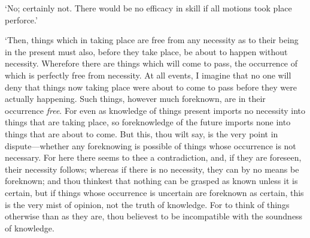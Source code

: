 \documentclass[11pt]{book}
\begin{document}
`No; certainly not. There would be no efficacy in skill if all motions
took place perforce.'

`Then, things which in taking place are free from any necessity as to
their being in the present must also, before they take place, be about
to happen without necessity. Wherefore there are things which will come
to pass, the occurrence of which is perfectly free from necessity. At
all events, I imagine that no one will deny that things now taking place
were about to come to pass before they were actually happening. Such
things, however much foreknown, are in their occurrence \emph{free}. For even
as knowledge of things present imports no necessity into things that are
taking place, so foreknowledge of the future imports none into things
that are about to come. But this, thou wilt say, is the very point in
dispute---whether any foreknowing is possible of things whose occurrence
is not necessary. For here there seems to thee a contradiction, and, if
they are foreseen, their necessity follows; whereas if there is no
necessity, they can by no means be foreknown; and thou thinkest that
nothing can be grasped as known unless it is certain, but if things
whose occurrence is uncertain are foreknown as certain, this is the very
mist of opinion, not the truth of knowledge. For to think of things
otherwise than as they are, thou believest to be incompatible with the \linebreak
soundness of knowledge.
\end{document}
